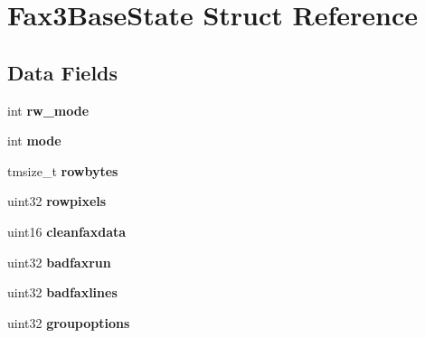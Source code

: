 \hypertarget{struct_fax3_base_state}{}\section{Fax3\+Base\+State Struct Reference}
\label{struct_fax3_base_state}
\subsection*{Data Fields}
\begin{DoxyCompactItemize}
\item 
\hypertarget{struct_fax3_base_state_a1dc8237f4aaebb684112dbc6e041ef32}{}int {\bfseries rw\+\_\+mode}\label{struct_fax3_base_state_a1dc8237f4aaebb684112dbc6e041ef32}

\item 
\hypertarget{struct_fax3_base_state_a1ea5d0cb93f22f7d0fdf804bd68c3326}{}int {\bfseries mode}\label{struct_fax3_base_state_a1ea5d0cb93f22f7d0fdf804bd68c3326}

\item 
\hypertarget{struct_fax3_base_state_a258d8542ded355539ae0f0c4f1fa934b}{}tmsize\+\_\+t {\bfseries rowbytes}\label{struct_fax3_base_state_a258d8542ded355539ae0f0c4f1fa934b}

\item 
\hypertarget{struct_fax3_base_state_af71e0b78b77e6594377d210d7ec746b2}{}uint32 {\bfseries rowpixels}\label{struct_fax3_base_state_af71e0b78b77e6594377d210d7ec746b2}

\item 
\hypertarget{struct_fax3_base_state_a068ca964a82240fb6c88eeb3acaf1934}{}uint16 {\bfseries cleanfaxdata}\label{struct_fax3_base_state_a068ca964a82240fb6c88eeb3acaf1934}

\item 
\hypertarget{struct_fax3_base_state_ad2beeba7a0bf1163837ad7e8d5472f2a}{}uint32 {\bfseries badfaxrun}\label{struct_fax3_base_state_ad2beeba7a0bf1163837ad7e8d5472f2a}

\item 
\hypertarget{struct_fax3_base_state_a1a9dd04900d5bd32b93c8b1c154ed62b}{}uint32 {\bfseries badfaxlines}\label{struct_fax3_base_state_a1a9dd04900d5bd32b93c8b1c154ed62b}

\item 
\hypertarget{struct_fax3_base_state_a9bc866e7a311ce828ccebdf6b9ad6d75}{}uint32 {\bfseries groupoptions}\label{struct_fax3_base_state_a9bc866e7a311ce828ccebdf6b9ad6d75}


\end{DoxyCompactItemize}
